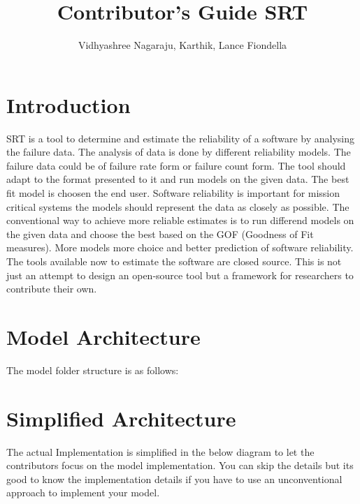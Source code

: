 \documentclass[journal]{IEEEtran}
\title{Contributor's Guide SRT}
\author{Vidhyashree Nagaraju, Karthik, Lance Fiondella }
\begin{document}
\maketitle

\section{Introduction}

SRT is a tool to determine and estimate the reliability of a software by analysing the failure data. The analysis of data is done by different reliability models. The failure data could be of failure rate form or failure count form. The tool should adapt to the format presented to it and run models on the given data. The best fit model is choosen the end user. Software reliability is important for mission critical systems the models should represent the data as closely as possible. The conventional way to achieve more reliable estimates is to run differend models on the given data and choose the best based on the GOF (Goodness of Fit measures). More models more choice and better prediction of software reliability. The tools available now to estimate the software are closed source. This is not just an attempt to design an open-source tool but a framework for researchers to contribute their own.


\section{Model Architecture}
The model folder structure is as follows:


\section{Simplified Architecture}

The actual Implementation is simplified in the below diagram to let the contributors focus on the model implementation. You can skip the details but its good to know the implementation details if you have to use an unconventional approach to implement your model.
\end{document}

